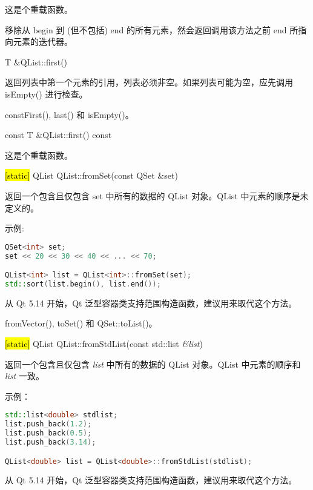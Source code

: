 这是个重载函数。

移除从 begin 到 (但不包括) end 的所有元素，然会返回调用该方法之前 end
所指向元素的迭代器。

T \&QList::first()

返回列表中第一个元素的引用，列表必须非空。如果列表可能为空，应先调用 isEmpty() 进行检查。

\begin{notice}[另请参阅]
constFirst(), last() 和 isEmpty()。
\end{notice}

const T \&QList::first() const

这是个重载函数。

\hl{[static]} QList QList::fromSet(const QSet \&set)

返回一个包含且仅包含 set 中所有的数据的 QList 对象。QList 中元素的顺序是未定义的。

示例:


\begin{lstlisting}[language=C++]
QSet<int> set;
set << 20 << 30 << 40 << ... << 70;

QList<int> list = QList<int>::fromSet(set);
std::sort(list.begin(), list.end());
\end{lstlisting}

\begin{notice}
从 Qt 5.14 开始，Qt 泛型容器类支持范围构造函数，建议用来取代这个方法。
\end{notice}


\begin{notice}[另请参阅]
fromVector(), toSet() 和 QSet::toList()。
\end{notice}


\hl{[static]} QList QList::fromStdList(const std::list \emph{\&list})

返回一个包含且仅包含 \emph{list} 中所有的数据的 QList 对象。QList 中元素的顺序和 \emph{list} 一致。

示例：


\begin{lstlisting}[language=C++]
std::list<double> stdlist;
list.push_back(1.2);
list.push_back(0.5);
list.push_back(3.14);

QList<double> list = QList<double>::fromStdList(stdlist);
\end{lstlisting}


\begin{notice}
从 Qt 5.14 开始，Qt 泛型容器类支持范围构造函数，建议用来取代这个方法。
\end{notice}


